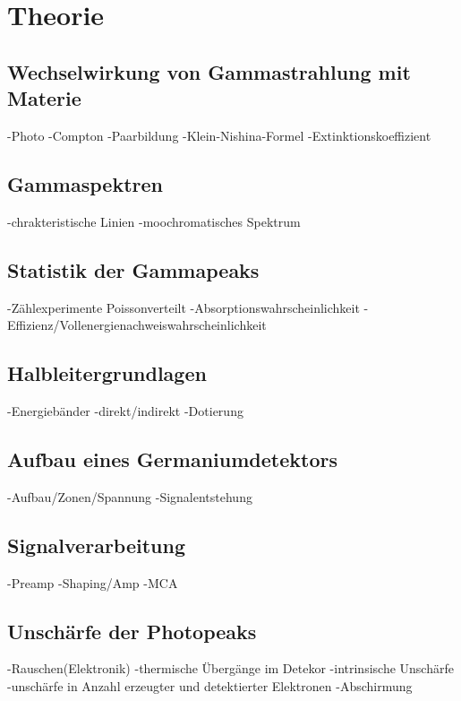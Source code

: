 \section{Theorie}
\label{sec:Theorie}
\subsection{Wechselwirkung von Gammastrahlung mit Materie}
-Photo
-Compton
-Paarbildung
-Klein-Nishina-Formel
-Extinktionskoeffizient
\subsection{Gammaspektren}
-chrakteristische Linien
-moochromatisches Spektrum

\subsection{Statistik der Gammapeaks}
-Zählexperimente Poissonverteilt
-Absorptionswahrscheinlichkeit
-Effizienz/Vollenergienachweiswahrscheinlichkeit
\subsection{Halbleitergrundlagen}
-Energiebänder
-direkt/indirekt
-Dotierung
\subsection{Aufbau eines Germaniumdetektors}
-Aufbau/Zonen/Spannung
-Signalentstehung

\subsection{Signalverarbeitung}
-Preamp
-Shaping/Amp
-MCA
\subsection{Unschärfe der Photopeaks}
-Rauschen(Elektronik)
-thermische Übergänge im Detekor
-intrinsische Unschärfe
-unschärfe in Anzahl erzeugter und detektierter Elektronen
-Abschirmung



